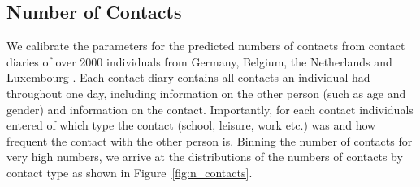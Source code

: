 \subsection{Number of Contacts}
\label{subsec:data_number_of_contacts}

We calibrate the parameters for the predicted numbers of contacts from contact diaries of
over 2000 individuals from Germany, Belgium, the Netherlands and Luxembourg
\citep{Mossong2008}. Each contact diary contains all contacts an individual had
throughout one day, including information on the other person (such as age and gender)
and information on the contact. Importantly, for each contact individuals entered of
which type the contact (school, leisure, work etc.) was and how frequent the contact with
the other person is. Binning the number of contacts for very high numbers, we arrive at
the distributions of the numbers of contacts by contact type as shown in Figure~\ref{fig:n_contacts}.

